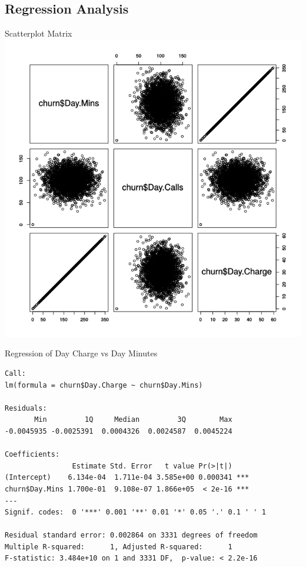\documentclass[handout]{beamer}
\begin{document}
\subsection{Regression Analysis}
\begin{frame}{Scatterplot Matrix}
    \centering
    \includegraphics[height=0.8\textheight]{images/scatter-call-charge}
\end{frame}

\begin{frame}[fragile]{Regression of Day Charge vs Day Minutes}
\scriptsize
\begin{verbatim}
Call:
lm(formula = churn$Day.Charge ~ churn$Day.Mins)

Residuals:
       Min         1Q     Median         3Q        Max 
-0.0045935 -0.0025391  0.0004326  0.0024587  0.0045224 

Coefficients:
                Estimate Std. Error   t value Pr(>|t|)    
(Intercept)    6.134e-04  1.711e-04 3.585e+00 0.000341 ***
churn$Day.Mins 1.700e-01  9.108e-07 1.866e+05  < 2e-16 ***
---
Signif. codes:  0 '***' 0.001 '**' 0.01 '*' 0.05 '.' 0.1 ' ' 1

Residual standard error: 0.002864 on 3331 degrees of freedom
Multiple R-squared:      1,	Adjusted R-squared:      1 
F-statistic: 3.484e+10 on 1 and 3331 DF,  p-value: < 2.2e-16
\end{verbatim}
\end{frame}
\end{document}

